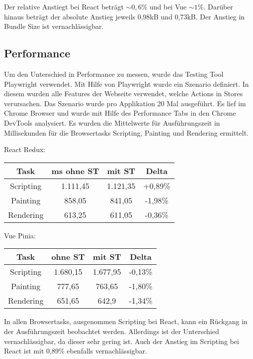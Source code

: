 Der relative Anstiegt bei React beträgt $\sim0,6\%$ und bei Vue $\sim1\%$. Darüber hinaus beträgt der absolute Anstieg jeweils 0,98kB und 0,73kB. Der Anstieg in Bundle Size ist vernachlässigbar.

\subsection{Performance}

Um den Unterschied in Performance zu messen, wurde das Testing Tool Playwright verwendet. Mit Hilfe von Playwright wurde ein Szenario definiert. In diesem wurden alle Features der Webseite verwendet, welche Actions in Stores verursachen. Das Szenario wurde pro Applikation 20 Mal ausgeführt. Es lief im Chrome Browser und wurde mit Hilfe des Performance Tabs in den Chrome DevTools analysiert. Es wurden die Mittelwerte für Ausführungszeit in Millisekunden für die Browsertasks Scripting, Painting und Rendering ermittelt.

React Redux:

\begin{center}
  \begin{tabular}{|c|c|c|c|} 
   \hline
   Task & ms ohne ST & mit ST & Delta \\ [0.5ex]
   \hline\hline
   Scripting & 1.111,45 & 1.121,35 & +0,89\% \\
   \hline
   Painting & 858,05 & 841,05 & -1,98\% \\
   \hline
   Rendering & 613,25 & 611,05 & -0,36\% \\
   \hline
  \end{tabular}
\end{center}

Vue Pinia:

\begin{center}
  \begin{tabular}{|c|c|c|c|} 
   \hline
   Task & ohne ST & mit ST & Delta \\ [0.5ex]
   \hline\hline
   Scripting & 1.680,15 & 1.677,95 & -0,13\% \\
   \hline
   Painting & 777,65 & 763,65 & -1,80\% \\
   \hline
   Rendering & 651,65 & 642,9 & -1,34\% \\
   \hline
  \end{tabular}
\end{center}

In allen Browsertasks, ausgenommen Scripting bei React, kann ein Rückgang in der Ausführungszeit beobachtet werden. Allerdings ist der Unterschied vernachlässigbar, da dieser sehr gering ist. Auch der Anstieg im Scripting bei React ist mit 0,89\% ebenfalls vernachlässigbar.

